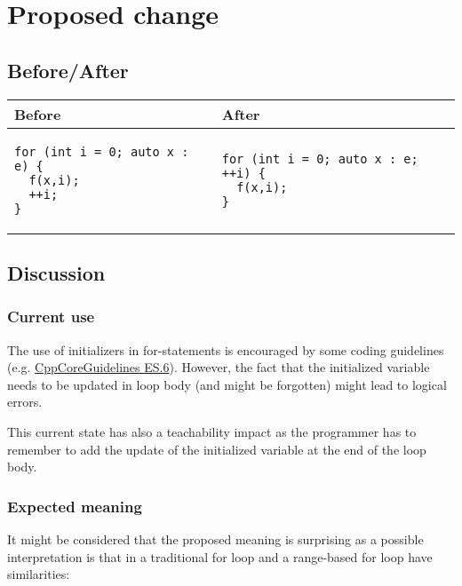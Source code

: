 \section{Proposed change}

\subsection{Before/After}

\begin{center}
\begin{tabular}{|p{}|p{}|}
\hline
\textbf{Before} & \textbf{After}\\
\hline
\begin{lstlisting}
for (int i = 0; auto x : e) {
  f(x,i);
  ++i;
}
\end{lstlisting}
&
\begin{lstlisting}
for (int i = 0; auto x : e; ++i) {
  f(x,i);
}
\end{lstlisting}
\\
\hline
\end{tabular}
\end{center}

\subsection{Discussion}

\subsubsection{Current use}

The use of initializers in for-statements is encouraged by some coding guidelines
(e.g.
\href{https://isocpp.github.io/CppCoreGuidelines/CppCoreGuidelines#es6-declare-names-in-for-statement-initializers-and-conditions-to-limit-scope}{CppCoreGuidelines
ES.6}). However, the fact that the initialized variable needs to be updated in
loop body (and might be forgotten) might lead to logical errors.

This current state has also a teachability impact as the programmer has to
remember to add the update of the initialized variable at the end of the loop
body.

\subsubsection{Expected meaning}

It might be considered that the proposed meaning is surprising as a possible
interpretation is that in a traditional for loop and a range-based for loop
have similarities:

